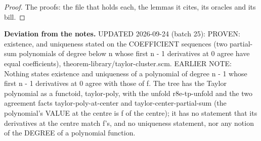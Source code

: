 %
\begin{proof}
%
The proofs: the file that holds each, the lemmas it cites, its oracles and its bill.
%
%
%
%
\end{proof}
%
\noindent\textbf{Deviation from the notes.} UPDATED 2026-09-24 (batch 25): PROVEN: existence, and uniqueness stated on the COEFFICIENT sequences (two partial-sum polynomials of degree below n whose first n - 1 derivatives at 0 agree have equal coefficients), theorem-library/taylor-cluster.scm. EARLIER NOTE: Nothing states existence and uniqueness of a polynomial of degree n - 1 whose first n - 1 derivatives at 0 agree with those of f. The tree has the Taylor polynomial as a functoid, taylor-poly, with the unfold r8e-tp-unfold and the two agreement facts taylor-poly-at-center and taylor-center-partial-sum (the polynomial's VALUE at the centre is f of the centre); it has no statement that its derivatives at the centre match f's, and no uniqueness statement, nor any notion of the DEGREE of a polynomial function.
%
\renewcommand{\thethm}{2.18}
